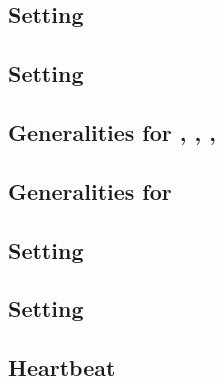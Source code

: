 \subsection{Setting \accInputs{}}                                           \label{bls data: setting acc pairings}                               
\subsection{Setting \internalChecksPassed{}}                                \label{bls data: setting internal checks have passed}                

\subsection{Generalities for \cOneMembershipTestRequired{}, \cTwoMembershipTestRequired{}, \gOneMembershipTestRequired{}, \gTwoMembershipTestRequired{}}                     \label{bls: generalities for membership test}                        

\subsection{Generalities for \acceptablePairOfPoints{}}                     \label{bls data: generalities for acceptable pairs of points}        

\subsection{Setting \trivialAllInf{}}                                      \label{bls: setting trivial all infty}                                 
\subsection{Setting \trivialWithMembershipCheck{}}                         \label{bls: setting trivial with membership check}                     

\subsection{Heartbeat}                                                      \label{bls data: heartbeat}                                          
